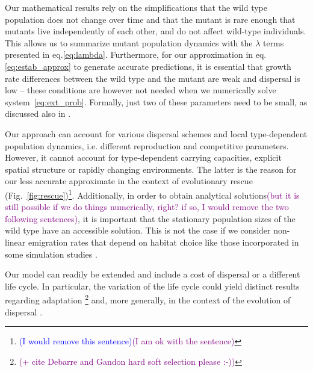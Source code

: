 \documentclass[11pt]{article}
\newcommand{\florence}[1]{\textcolor{purple}{(#1)}} %
\newcommand{\francois}[1]{\textcolor{blue}{(#1)}}
\begin{document}
Our mathematical results rely on the simplifications that the wild type population does not change over time and that the mutant is rare enough that mutants live independently of each other, and do not affect wild-type individuals. This allows us to summarize mutant population dynamics with the $\lambda$ terms presented in eq.\eqref{eq:lambda}. Furthermore, for our approximation in eq. \eqref{eq:estab_approx} to generate accurate predictions, it is essential that growth rate differences between the wild type and the mutant are weak and dispersal is low -- these conditions are however not needed when we numerically solve system~\eqref{eq:ext_prob}. Formally, just two of these parameters need to be small, as discussed also in \citet{tomasini_2018}. 

Our approach can account for various dispersal schemes and local type-dependent population dynamics, i.e. different reproduction and competitive parameters. However, it cannot account for type-dependent carrying capacities, explicit spatial structure %
or rapidly changing environments.  The latter is the reason for our less accurate approximate in the context of evolutionary rescue (Fig.~\ref{fig:rescue})\footnote{\francois{I would remove this sentence}\florence{I am ok with the sentence}}. Additionally, in order to obtain analytical solutions\florence{but it is still possible if we do things numerically, right? if so, I would remove the two following sentences}, it is important that the stationary population sizes of the wild type have an accessible solution. This is not the case if we consider non-linear emigration rates that depend on habitat choice like those incorporated in some simulation studies \citep[e.g][]{holt_2015, mortier_2018}.  

Our model can readily be extended and include a cost of dispersal or a different life cycle. In particular, the variation of the life cycle could yield distinct results regarding adaptation \citep{holt_2015}\footnote{\florence{+ cite Debarre and Gandon hard soft selection please :-)}} and, more generally, in the context of the evolution of dispersal \citep{massol_2015}. \\
\end{document}
